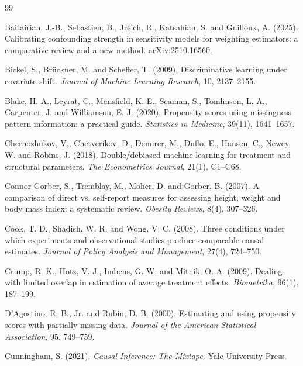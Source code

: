 \begin{thebibliography}{99}\small

 Baitairian, J.-B., Sebastien, B., Jreich, R., Katsahian, S. and Guilloux, A. (2025). Calibrating confounding strength in sensitivity models for weighting estimators: a comparative review and a new method. arXiv:2510.16560.

 Bickel, S., Brückner, M. and Scheffer, T. (2009). Discriminative learning under covariate shift. \emph{Journal of Machine Learning Research}, 10, 2137--2155.

 Blake, H. A., Leyrat, C., Mansfield, K. E., Seaman, S., Tomlinson, L. A., Carpenter, J. and Williamson, E. J. (2020). Propensity scores using missingness pattern information: a practical guide. \emph{Statistics in Medicine}, 39(11), 1641--1657.

 Chernozhukov, V., Chetverikov, D., Demirer, M., Duflo, E., Hansen, C., Newey, W. and Robins, J. (2018). Double/debiased machine learning for treatment and structural parameters. \emph{The Econometrics Journal}, 21(1), C1--C68.

 Connor Gorber, S., Tremblay, M., Moher, D. and Gorber, B. (2007). A comparison of direct vs. self-report measures for assessing height, weight and body mass index: a systematic review. \emph{Obesity Reviews}, 8(4), 307--326.

 Cook, T. D., Shadish, W. R. and Wong, V. C. (2008). Three conditions under which experiments and observational studies produce comparable causal estimates. \emph{Journal of Policy Analysis and Management}, 27(4), 724--750.

 Crump, R. K., Hotz, V. J., Imbens, G. W. and Mitnik, O. A. (2009). Dealing with limited overlap in estimation of average treatment effects. \emph{Biometrika}, 96(1), 187--199.

 D'Agostino, R. B., Jr. and Rubin, D. B. (2000). Estimating and using propensity scores with partially missing data. \emph{Journal of the American Statistical Association}, 95, 749--759.

 Cunningham, S. (2021). \emph{Causal Inference: The Mixtape}. Yale University Press.


\end{thebibliography}
